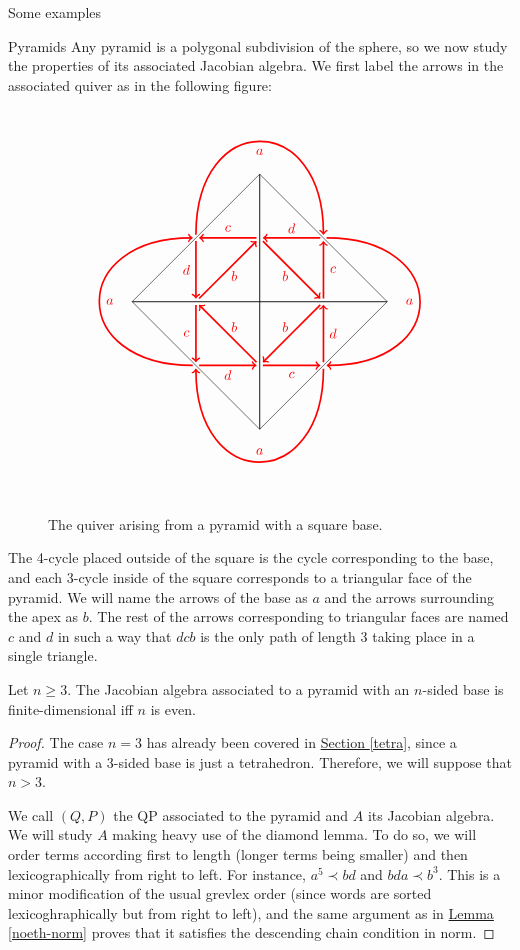 \begin{chapter}{Some examples}
\begin{section}{Pyramids}
Any pyramid is a polygonal subdivision of the sphere, so we now study the properties of its associated Jacobian algebra. We first label the arrows in the associated quiver as in the following figure:
\begin{figure}[h]
\[
\begin{tikzpicture}[scale=0.8]
\foreach \x in {0,90,...,270}
{
\begin{scope}[rotate=\x]
\draw (0,0) -- (4,0);
\draw (0,0) -- (0,-4);
\draw (4,0) -- (0,-4);
\node at (0.8,-0.8) {\textcolor{red}{$b$}};
\node at (1,-2.3) {\textcolor{red}{$c$}};
\node at (2.3,-1) {\textcolor{red}{$d$}};
\node at (0,-4.7) {\textcolor{red}{$a$}};
\draw [<-, red, very thick] (0.1, -1.9) to (1.9, -0.1);
\draw [<-, red, very thick] (2, -0.1) to  (2, -1.9);
\draw [<-, red, very thick] (1.9, -2) to  (0.1, -2);
\draw [<-, red, very thick] (-2, -2.1) to [bend right=90, looseness=2.5] (2, -2.1);
\end{scope}
}
\end{tikzpicture}
\]
\caption{The quiver arising from a pyramid with a square base.}
\label{pyramid}
\end{figure}
The 4-cycle placed outside of the square is the cycle corresponding to the base, and each 3-cycle inside of the square corresponds to a triangular face of the pyramid. We will name the arrows of the base as $a$ and the arrows surrounding the apex as $b$. The rest of the arrows corresponding to triangular faces are named $c$ and $d$ in such a way that $dcb$ is the only path of length 3 taking place in a single triangle.

\begin{thm} Let $n\geq 3$. The Jacobian algebra associated to a pyramid with an $n$-sided base is finite-dimensional iff $n$ is even.
\end{thm}
\begin{proof} The case $n=3$ has already been covered in \hyperref[tetra]{Section \ref*{tetra}}, since a pyramid with a 3-sided base is just a tetrahedron. Therefore, we will suppose that $n> 3$.

We call $(Q,P)$ the QP associated to the pyramid and $A$ its Jacobian algebra. We will study $A$ making heavy use of the diamond lemma. To do so, we will order terms according first to length (longer terms being smaller) and then lexicographically from right to left. For instance, $a^5 \prec bd$ and $bda \prec b^3$. This is a minor modification of the usual grevlex order (since words are sorted lexicoghraphically but from right to left), and the same argument as in \hyperref[noeth-norm]{Lemma \ref*{noeth-norm}} proves that it satisfies the descending chain condition in norm.


\end{proof}
\end{section}
\end{chapter}
